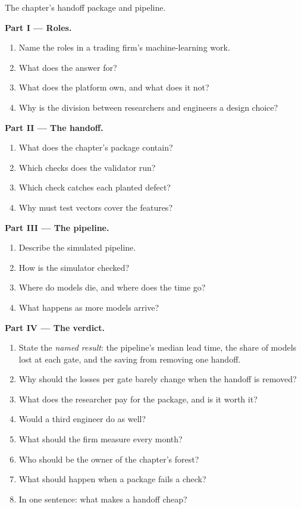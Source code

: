 \begin{problem}\label{pb:ml:the-machine-learning-team:1}
The chapter's handoff package and pipeline.

\medskip\noindent\textbf{Part I --- Roles.}
\begin{enumerate}
\item Name the roles in a trading firm's machine-learning work.
\item What does the  answer for?
\item What does the platform own, and what does it not?
\item Why is the division between researchers and engineers a design choice?
\end{enumerate}

\medskip\noindent\textbf{Part II --- The handoff.}
\begin{enumerate}[resume]
\item What does the chapter's package contain?
\item Which checks does the validator run?
\item Which check catches each planted defect?
\item Why must test vectors cover the features?
\end{enumerate}

\medskip\noindent\textbf{Part III --- The pipeline.}
\begin{enumerate}[resume]
\item Describe the simulated pipeline.
\item How is the simulator checked?
\item Where do models die, and where does the time go?
\item What happens as more models arrive?
\end{enumerate}

\medskip\noindent\textbf{Part IV --- The verdict.}
\begin{enumerate}[resume]
\item State the \emph{named result}: the pipeline's median lead time, the share of models lost at each gate, and the saving from
removing one handoff.
\item Why should the losses per gate barely change when the handoff is removed?
\item What does the researcher pay for the package, and is it worth it?
\item Would a third engineer do as well?
\item What should the firm measure every month?
\item Who should be the owner of the chapter's forest?
\item What should happen when a package fails a check?
\item In one sentence: what makes a handoff cheap?
\end{enumerate}
\end{problem}

